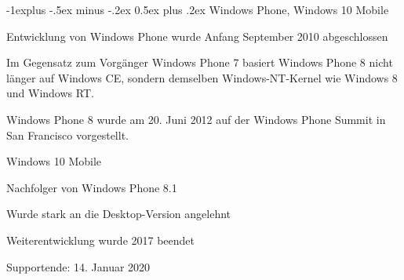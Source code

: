 \documentclass[a4paper, 8pt]{article}
\makeatletter
\renewcommand{\subsection}{\@startsection{subsection}{2}{0mm}%
                                {-1explus -.5ex minus -.2ex}%
                                {0.5ex plus .2ex}%
                                {\normalfont\normalsize\bfseries}}
\makeatother
\begin{document}
\begin{multicols*}{2}
  \subsection{Windows Phone, Windows 10 Mobile}
  \begin{itemize*}
    \item Entwicklung von Windows Phone wurde Anfang September 2010 abgeschlossen
    \item Im Gegensatz zum Vorgänger Windows Phone 7 basiert Windows Phone 8 nicht länger auf Windows CE, sondern demselben Windows-NT-Kernel wie Windows 8 und Windows RT.
    \item Windows Phone 8 wurde am 20. Juni 2012 auf der Windows Phone Summit in San Francisco vorgestellt.
    \item Windows 10 Mobile
    \begin{itemize*}
      \item Nachfolger von Windows Phone 8.1
      \item Wurde stark an die Desktop-Version angelehnt
      \item Weiterentwicklung wurde 2017 beendet
      \item Supportende: 14. Januar 2020
    \end{itemize*}
  \end{itemize*}


\end{multicols*}
\end{document}
